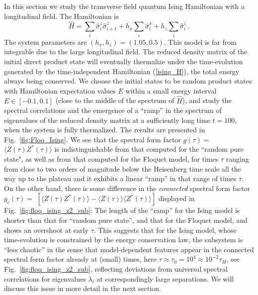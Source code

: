 \documentclass[aps,prb,preprint,onecolumn,amsmath,amssymb,superscriptaddress,eqsecnum,floatfix,scrartcl]{revtex4-1}
\begin{document}
In this section we
study the transverse field quantum  Ising Hamiltonian
with a longitudinal field. The Hamiltonian is 
\begin{equation}
\hat H=\sum_i\hat\sigma^z_i\hat\sigma^z_{i+1}+h_x\sum_i \hat\sigma^x_i+h_z\sum_i \hat\sigma^z_i ~.
\label{ising_H}
\end{equation}
The system parameters are
$(h_x,h_z)=(1.05, 0.5)$.\cite{Banuls2011} This model is 
far from integrable
 due to the large longitudinal field. 
The  reduced density matrix of
 the initial direct product state will eventually thermalize under the time-evolution generated
by the time-independent Hamiltonian (\ref{ising_H}), the total energy 
always 
being conserved.
We choose the  initial states to be  random product states with Hamiltonian expectation values $E$
 within a small energy 
interval  $E \in [-0.1, 0.1]$ 
(close to the middle of the spectrum of ${\hat H}$), 
and study the spectral correlations and the emergence of a ``ramp'' in
the spectrum of
eigenvalues of the reduced density matrix
at a  sufficiently long time 
$t=100$, when the system is fully thermalized. 
The results are presented  in Fig.~\ref{fig:Floq_Ising}. We see
that the spectral form factor $g(\tau)=$ $\langle Z(\tau)Z^*(\tau)\rangle$ 
is indistinguishable from that
computed for the ``random 
pure  state",
as well as from  that computed  for the  Floquet model,  for times $\tau$
ranging from close to two orders of magnitude below the Heisenberg time scale all the way up to the plateau
and it exhibits a linear  ``ramp'' in that range of times $\tau$.
On the other hand, 
there is some difference
in  the
{\it connected} spectral
form factor $g_c(\tau)=$  $[\langle Z(\tau)Z^*(\tau)\rangle-\langle Z(\tau)\rangle\langle Z^*(\tau)\rangle]$ 
displayed in Fig.~\ref{fig:floq_ising_z2_sub}:  The length of the ``ramp'' for the  Ising model is shorter than that for ``random pure state'', and 
that for the Floquet model, 
and shows an overshoot at early $\tau$. This suggests that for the Ising model,
whose time-evolution is  
constrained by the energy conservation law, the subsystem is ``less chaotic'' in the sense that model-dependent features appear in the connected
spectral form factor
already at (small) times, here  $\tau \approx \tau_0= 10^4\approx 10^{-2} \tau_H$, see  Fig.~\ref{fig:floq_ising_z2_sub},
reflecting deviations from  universal spectral
correlations for eigenvalues $\lambda_i$ at  correspondingly large  separations.
We will discuss this issue in more detail in the next section.
\end{document}
